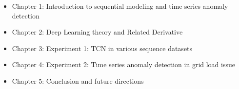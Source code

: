 \begin{itemize}
\item Chapter 1: Introduction to sequential modeling and time series anomaly detection
\item Chapter 2: Deep Learning theory and Related Derivative
\item Chapter 3: Experiment 1: TCN in various sequence datasets
\item Chapter 4: Experiment 2: Time series anomaly detection in grid load issue
\item Chapter 5: Conclusion and future directions
\end{itemize}
